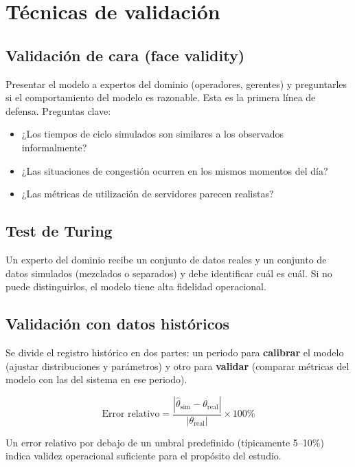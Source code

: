 \documentclass[11pt, letterpaper]{article}
\begin{document}
\section{Técnicas de validación}

\subsection{Validación de cara (face validity)}

Presentar el modelo a expertos del dominio (operadores, gerentes) y preguntarles si el comportamiento del modelo es razonable. Esta es la primera línea de defensa. Preguntas clave:
\begin{itemize}
    \item ¿Los tiempos de ciclo simulados son similares a los observados informalmente?
    \item ¿Las situaciones de congestión ocurren en los mismos momentos del día?
    \item ¿Las métricas de utilización de servidores parecen realistas?
\end{itemize}

\subsection{Test de Turing}

Un experto del dominio recibe un conjunto de datos reales y un conjunto de datos simulados (mezclados o separados) y debe identificar cuál es cuál. Si no puede distinguirlos, el modelo tiene alta fidelidad operacional.

\subsection{Validación con datos históricos}

Se divide el registro histórico en dos partes: un periodo para \textbf{calibrar} el modelo (ajustar distribuciones y parámetros) y otro para \textbf{validar} (comparar métricas del modelo con las del sistema en ese periodo).

\[
\text{Error relativo} = \frac{|\hat\theta_{\text{sim}} - \theta_{\text{real}}|}{|\theta_{\text{real}}|} \times 100\%
\]

Un error relativo por debajo de un umbral predefinido (típicamente 5--10\%) indica validez operacional suficiente para el propósito del estudio.
\end{document}

